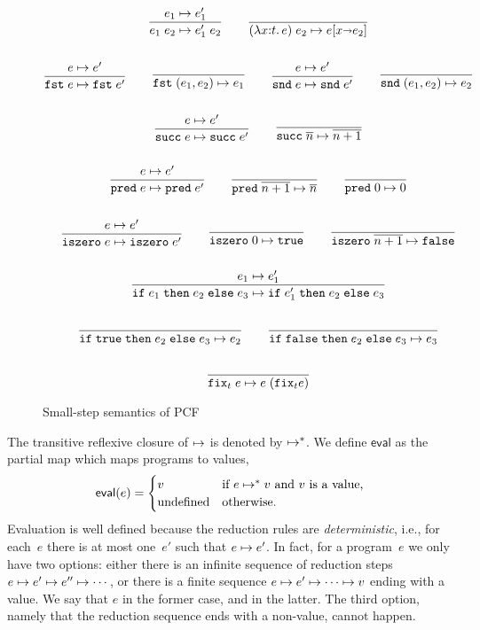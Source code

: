 \begin{figure}[htpb]
  \centering
\begin{gather*}
  \begin{gathered}\dfrac{e_1 \mapsto e_1'}{e_1 \; e_2 \mapsto e_1'\; e_2}\end{gathered}
  \qquad
  \dfrac{}{(\lambda x {:} t .\,e)\;e_2 \mapsto e[x {\shortrightarrow} e_2]}
  \\ \\
  \begin{gathered}\dfrac{e \mapsto e'}{\mathtt{fst}\;e \mapsto \mathtt{fst}\;e'}\end{gathered}
  \qquad
  \dfrac{}{\mathtt{fst}\;(e_1, e_2) \mapsto e_1}
  \qquad
  \begin{gathered}\dfrac{e \mapsto e'}{\mathtt{snd}\;e \mapsto \mathtt{snd}\;e'}\end{gathered}
  \qquad
  \dfrac{}{\mathtt{snd}\;(e_1, e_2) \mapsto e_2}
  \\ \\
  \begin{gathered}\dfrac{e \mapsto e'}{\mathtt{succ}\;e \mapsto \mathtt{succ}\;e'}\end{gathered}
  \qquad
  \dfrac{}{\mathtt{succ}\;\overline{n} \mapsto \overline{n+1}}
  \\ \\
  \begin{gathered}\dfrac{e \mapsto e'}{\mathtt{pred}\;e \mapsto \mathtt{pred}\;e'}\end{gathered}
  \qquad
  \dfrac{}{\mathtt{pred}\;\overline{n+1} \mapsto \overline{n}}
  \qquad
  \dfrac{}{\mathtt{pred}\;0 \mapsto 0}
  \\ \\
  \begin{gathered}\dfrac{e \mapsto e'}{\mathtt{iszero}\;e \mapsto \mathtt{iszero}\;e'}\end{gathered}
  \qquad
  \dfrac{}{\mathtt{iszero}\;0 \mapsto \mathtt{true}}
  \qquad
  \dfrac{}{\mathtt{iszero}\;\overline{n+1} \mapsto \mathtt{false}}
  \\ \\
  \begin{gathered}\dfrac{e_1 \mapsto e_1'}{\mathtt{if}\;e_1\;\mathtt{then}\;e_2\;\mathtt{else}\;e_3 \mapsto \mathtt{if}\;e_1'\;\mathtt{then}\;e_2\;\mathtt{else}\;e_3}\end{gathered}
  \\ \\
  \dfrac{}{\mathtt{if}\;\mathtt{true}\;\mathtt{then}\;e_2\;\mathtt{else}\;e_3 \mapsto e_2}
  \qquad
  \dfrac{}{\mathtt{if}\;\mathtt{false}\;\mathtt{then}\;e_2\;\mathtt{else}\;e_3 \mapsto e_3}
  \\ \\
  \dfrac{}{\mathtt{fix}_t\;e \mapsto e\;(\mathtt{fix}_t e)}
\end{gather*}
  \caption{Small-step semantics of PCF}
  \label{fig:pcf}
\end{figure}

The transitive reflexive closure of $\mapsto$ is denoted by $\mapsto^{*}$.
We define  $\mathsf{eval}$ as the partial map which
maps programs to values,
%
\begin{equation*}
  \mathsf{eval}(e) =
  \begin{cases}
    v & \text{if $e \mapsto^{*} v$ and $v$ is a value,}\\
    \text{undefined} & \text{otherwise.}
  \end{cases}
\end{equation*}
%
Evaluation is well defined because the reduction rules are
\emph{deterministic}, i.e., for each~$e$ there is at most one~$e'$
such that $e \mapsto e'$. In fact, for a program~$e$ we only have two
options: either there is an infinite sequence of reduction steps $e
\mapsto e' \mapsto e'' \mapsto \cdots$, or there is a finite sequence $e
\mapsto e' \mapsto \cdots \mapsto v$ ending with a value. We say that $e$
 in the former case, and  in the
latter. The third option, namely that the reduction sequence ends with
a non-value, cannot happen.

